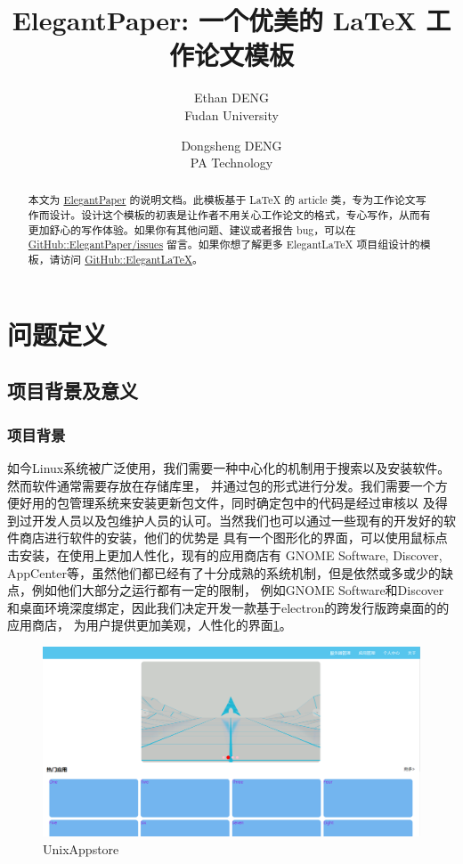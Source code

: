 \documentclass[lang=cn,a4paper]{elegantpaper}
\title{ElegantPaper: 一个优美的 \LaTeX{} 工作论文模板}
\author{Ethan DENG \\ Fudan University \and Dongsheng DENG \\ PA Technology}
\institute{\href{https://elegantlatex.org/}{Elegant\LaTeX{} 项目组}}
\date{\zhtoday}
\begin{document}
\maketitle

\begin{abstract}
本文为 \href{https://github.com/ElegantLaTeX/ElegantPaper/}{ElegantPaper} 的说明文档。此模板基于 \LaTeX{} 的 article 类，专为工作论文写作而设计。设计这个模板的初衷是让作者不用关心工作论文的格式，专心写作，从而有更加舒心的写作体验。如果你有其他问题、建议或者报告 bug，可以在 \href{https://github.com/ElegantLaTeX/ElegantPaper/issues}{GitHub::ElegantPaper/issues} 留言。如果你想了解更多 Elegant\LaTeX{} 项目组设计的模板，请访问 \href{https://github.com/ElegantLaTeX/}{GitHub::ElegantLaTeX}。
\end{abstract}

\section{问题定义}

\subsection{项目背景及意义}

\subsubsection{项目背景}

如今Linux系统被广泛使用，我们需要一种中心化的机制用于搜索以及安装软件。然而软件通常需要存放在存储库里，
并通过包的形式进行分发。我们需要一个方便好用的包管理系统来安装更新包文件，同时确定包中的代码是经过审核以
及得到过开发人员以及包维护人员的认可。当然我们也可以通过一些现有的开发好的软件商店进行软件的安装，他们的优势是
具有一个图形化的界面，可以使用鼠标点击安装，在使用上更加人性化，现有的应用商店有 GNOME Software, Discover, 
AppCenter等，虽然他们都已经有了十分成熟的系统机制，但是依然或多或少的缺点，例如他们大部分之运行都有一定的限制，
例如GNOME Software和Discover和桌面环境深度绑定，因此我们决定开发一款基于electron的跨发行版跨桌面的的应用商店，
为用户提供更加美观，人性化的界面\ref{UnixAppstore}。

\begin{figure}[ht]
    \centering
    \includegraphics[scale=0.25]{./image/UnixAppstore}
    \caption{UnixAppstore}
	\label{UnixAppstore}
\end{figure}
\end{document}
